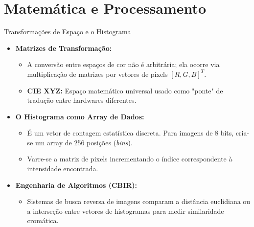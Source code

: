 \section[Processamento]{Matemática e Processamento}

\begin{frame}{Transformações de Espaço e o Histograma}
    \begin{itemize}
        \item \textbf{Matrizes de Transformação:}
        \begin{itemize}
            \item A conversão entre espaços de cor não é arbitrária; ela ocorre via multiplicação de matrizes por vetores de pixels $[R, G, B]^T$.
            \item \textbf{CIE XYZ:} Espaço matemático universal usado como "ponte" de tradução entre hardwares diferentes.
        \end{itemize}
        
        \vspace{0.2cm}
        
        \item \textbf{O Histograma como Array de Dados:}
        \begin{itemize}
            \item É um vetor de contagem estatística discreta. Para imagens de 8 bits, cria-se um array de 256 posições (\textit{bins}).
            \item Varre-se a matriz de pixels incrementando o índice correspondente à intensidade encontrada.
        \end{itemize}
        
        \vspace{0.2cm}
        
        \item \textbf{Engenharia de Algoritmos (CBIR):}
        \begin{itemize}
            \item Sistemas de busca reversa de imagens comparam a distância euclidiana ou a interseção entre vetores de histogramas para medir similaridade cromática.
        \end{itemize}
    \end{itemize}


\end{frame}
